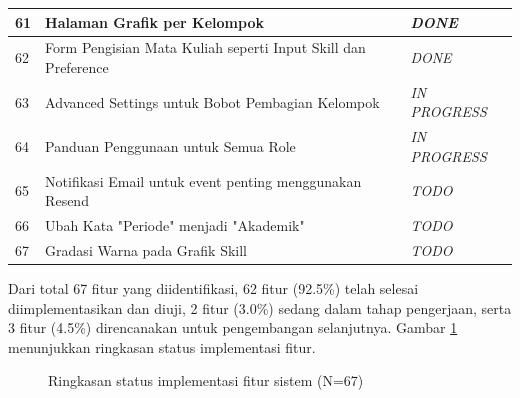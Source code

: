 \begin{longtable}{|p{}|p{}|p{}|}
	\hline
	61          & Halaman Grafik per Kelompok                                                  & \textit{DONE}        \\
	\hline
	62          & Form Pengisian Mata Kuliah seperti Input Skill dan Preference                & \textit{DONE}        \\
	\hline
	63          & Advanced Settings untuk Bobot Pembagian Kelompok                             & \textit{IN PROGRESS} \\
	\hline
	64          & Panduan Penggunaan untuk Semua Role                                          & \textit{IN PROGRESS} \\
	\hline
	65          & Notifikasi Email untuk event penting menggunakan Resend                      & \textit{TODO}        \\
	\hline
	66          & Ubah Kata "Periode" menjadi "Akademik"                                       & \textit{TODO}        \\
	\hline
	67          & Gradasi Warna pada Grafik Skill                                              & \textit{TODO}        \\
	\hline
\end{longtable}

\noindent
Dari total 67 fitur yang diidentifikasi, 62 fitur (92.5\%) telah selesai diimplementasikan dan diuji, 2 fitur (3.0\%) sedang dalam tahap pengerjaan, serta 3 fitur (4.5\%) direncanakan untuk pengembangan selanjutnya. Gambar \ref{fig:impl-fitur-status} menunjukkan ringkasan status implementasi fitur.

\begin{figure}[H]
	\centering
	\caption{Ringkasan status implementasi fitur sistem (N=67)}
	\label{fig:impl-fitur-status}
\end{figure}

